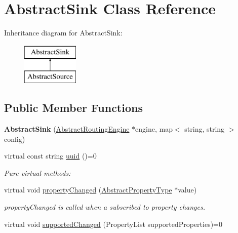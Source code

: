 \hypertarget{classAbstractSink}{\section{Abstract\-Sink Class Reference}
\label{classAbstractSink}
}
Inheritance diagram for Abstract\-Sink\-:\begin{figure}[H]
\begin{center}
\leavevmode
\includegraphics[height=2.000000cm]{classAbstractSink}
\end{center}
\end{figure}
\subsection*{Public Member Functions}
\begin{DoxyCompactItemize}
\item 
\hypertarget{classAbstractSink_a63f03d63fd091cd6f39a9888dd08ea6a}{{\bfseries Abstract\-Sink} (\hyperlink{classAbstractRoutingEngine}{Abstract\-Routing\-Engine} $\ast$engine, map$<$ string, string $>$ config)}\label{classAbstractSink_a63f03d63fd091cd6f39a9888dd08ea6a}

\item 
virtual const string \hyperlink{classAbstractSink_a965ae1d5218713c7823fbd95fa51b053}{uuid} ()=0
\begin{DoxyCompactList}\small\item\em Pure virtual methods\-: \end{DoxyCompactList}\item 
virtual void \hyperlink{classAbstractSink_afeb683c566a5a71303d05d2e12da2b28}{property\-Changed} (\hyperlink{classAbstractPropertyType}{Abstract\-Property\-Type} $\ast$value)
\begin{DoxyCompactList}\small\item\em property\-Changed is called when a subscribed to property changes. \end{DoxyCompactList}\item 
virtual void \hyperlink{classAbstractSink_aec23151301927f57330022beb175527b}{supported\-Changed} (Property\-List supported\-Properties)=0
\end{DoxyCompactItemize}
